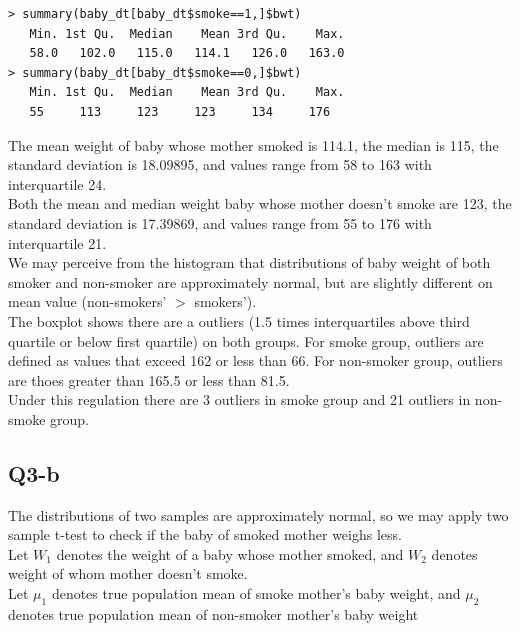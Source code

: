 \documentclass[12pt,letterpaper]{article}
\begin{document}
\begin{verbatim}
> summary(baby_dt[baby_dt$smoke==1,]$bwt)
   Min. 1st Qu.  Median    Mean 3rd Qu.    Max. 
   58.0   102.0   115.0   114.1   126.0   163.0 
> summary(baby_dt[baby_dt$smoke==0,]$bwt)
   Min. 1st Qu.  Median    Mean 3rd Qu.    Max. 
   55     113     123     123     134     176 
\end{verbatim}

\noindent The mean weight of baby whose mother smoked is 114.1, the median is 115, the standard deviation is 18.09895, and values range from 58 to 163 with interquartile 24. \\

\noindent Both the mean and median weight baby whose mother doesn't smoke are 123, the standard deviation is 17.39869, and values range from 55 to 176 with interquartile 21. \\

\noindent We may perceive from the histogram that distributions of baby weight of both smoker and non-smoker are approximately normal, but are slightly different on mean value (non-smokers' $>$ smokers'). \\

\noindent  The boxplot shows there are a outliers (1.5 times interquartiles above third quartile or below first quartile) on both groups. For smoke group, outliers are defined as values that exceed 162 or less than 66. For non-smoker group, outliers are thoes greater than 165.5 or less than 81.5. \\
\noindent Under this regulation there are 3 outliers in smoke group and 21 outliers in non-smoke group. 



\subsection*{Q3-b}
\noindent The distributions of two samples are approximately normal, so we may apply two sample t-test to check if the baby of smoked mother weighs less. \\

\noindent Let $W_1$ denotes the weight of a baby whose mother smoked, and $W_2$ denotes weight of whom mother doesn't smoke. \\

\noindent Let $\mu_1$ denotes true population mean of smoke mother's baby weight, and $\mu_2$ denotes true population mean of non-smoker mother's baby weight \\
\end{document}
